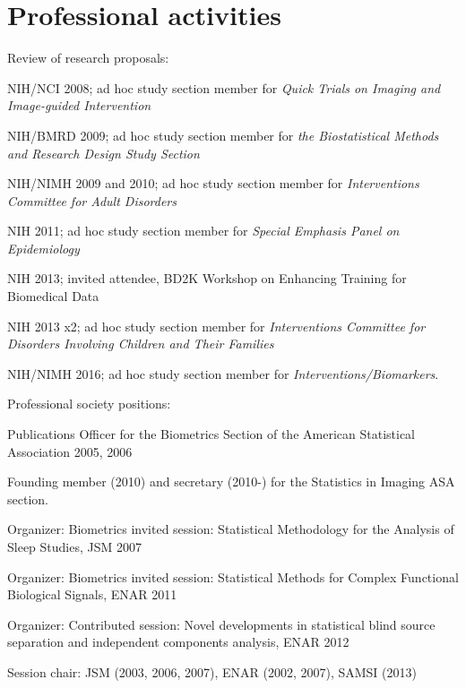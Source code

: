 \documentclass[12pt]{article}
\begin{document}
\section*{Professional activities}
\begin{description}{}{}
\item Review of research proposals:
  \begin{description}
  \item NIH/NCI  2008; ad hoc study section member for {\it Quick Trials on Imaging and Image-guided Intervention}
  \item NIH/BMRD 2009; ad hoc study section member for {\it the Biostatistical Methods and Research Design Study Section}
  \item NIH/NIMH 2009 and 2010; ad hoc study section member for {\it Interventions Committee for Adult Disorders}
  \item NIH      2011; ad hoc study section member for {\it Special Emphasis Panel on Epidemiology} 
  \item NIH      2013; invited attendee, BD2K Workshop on Enhancing Training for Biomedical Data
  \item NIH		 2013 x2; ad hoc study section member for {\it Interventions Committee for Disorders Involving Children and Their Families}
  \item NIH/NIMH 2016; ad hoc study section member for {\it Interventions/Biomarkers}.
  \end{description}
\item Professional society positions:
\begin{description}
\item Publications Officer for the Biometrics Section of the American Statistical Association 2005, 2006
\item Founding member (2010) and secretary (2010-) for the Statistics in Imaging ASA section.
\item Organizer: Biometrics invited session: Statistical Methodology for the Analysis of Sleep Studies, JSM 2007 
\item Organizer: Biometrics invited session: Statistical Methods for Complex Functional Biological Signals, ENAR 2011
\item Organizer: Contributed session: Novel developments in statistical blind source separation and independent components analysis, ENAR 2012
\item Session chair: JSM (2003, 2006, 2007), ENAR (2002, 2007), SAMSI (2013) 
\end{description}
\end{description}
\end{document}
